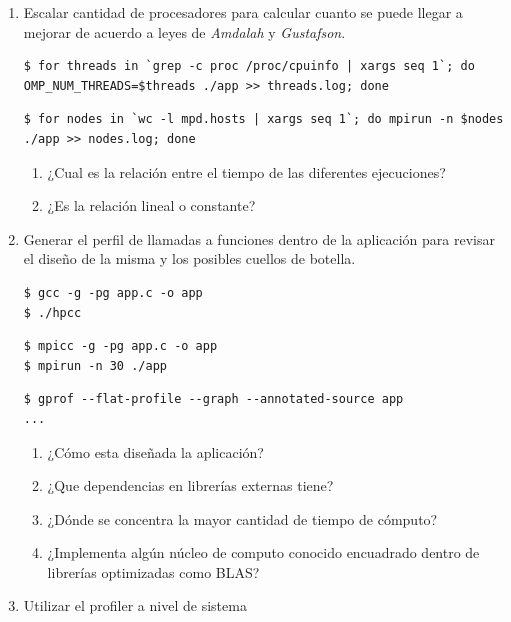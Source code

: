 \documentclass[a4paper]{report}
\begin{document}
\begin{enumerate}
\item Escalar cantidad de procesadores para calcular cuanto se puede llegar a mejorar de acuerdo a leyes de {\it Amdalah} y {\it Gustafson}.

\begin{lstlisting}
$ for threads in `grep -c proc /proc/cpuinfo | xargs seq 1`; do OMP_NUM_THREADS=$threads ./app >> threads.log; done
\end{lstlisting}

\begin{lstlisting}
$ for nodes in `wc -l mpd.hosts | xargs seq 1`; do mpirun -n $nodes ./app >> nodes.log; done
\end{lstlisting}

\begin{enumerate}
\item ¿Cual es la relación entre el tiempo de las diferentes ejecuciones?
\item ¿Es la relación lineal o constante?
\end{enumerate}

\item Generar el perfil de llamadas a funciones dentro de la aplicación para revisar el diseño de la misma y los posibles cuellos de botella.

\begin{lstlisting}
$ gcc -g -pg app.c -o app
$ ./hpcc
\end{lstlisting}

\begin{lstlisting}
$ mpicc -g -pg app.c -o app
$ mpirun -n 30 ./app
\end{lstlisting}

\begin{lstlisting}
$ gprof --flat-profile --graph --annotated-source app
...
\end{lstlisting}

\begin{enumerate}
\item ¿Cómo esta diseñada la aplicación?
\item ¿Que dependencias en librerías externas tiene?
\item ¿Dónde se concentra la mayor cantidad de tiempo de cómputo?
\item ¿Implementa algún núcleo de computo conocido encuadrado dentro de librerías optimizadas como BLAS?
\end{enumerate}

\item Utilizar el profiler a nivel de sistema


\end{enumerate}
\end{document}
